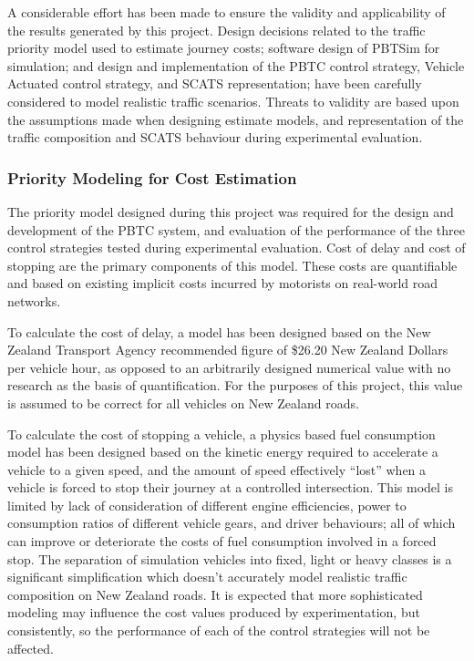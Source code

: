A considerable effort has been made to ensure the validity and applicability of the results generated by this project. Design decisions related to the traffic priority model used to estimate journey costs; software design of PBTSim for simulation; and design and implementation of the PBTC control strategy, Vehicle Actuated control strategy, and SCATS representation; have been carefully considered to model realistic traffic scenarios. Threats to validity are based upon the assumptions made when designing estimate models, and representation of the traffic composition and SCATS behaviour during experimental evaluation.

\subsubsection{Priority Modeling for Cost Estimation}

The priority model designed during this project was required for the design and development of the PBTC system, and evaluation of the performance of the three control strategies tested during experimental evaluation. Cost of delay and cost of stopping are the primary components of this model. These costs are quantifiable and based on existing implicit costs incurred by motorists on real-world road networks. 

To calculate the cost of delay, a model has been designed based on the New Zealand Transport Agency recommended figure of \$26.20 New Zealand Dollars per vehicle hour, as opposed to an arbitrarily designed numerical value with no research as the basis of quantification. For the purposes of this project, this value is assumed to be correct for all vehicles on New Zealand roads. 

To calculate the cost of stopping a vehicle, a physics based fuel consumption model has been designed based on the kinetic energy required to accelerate a vehicle to a given speed, and the amount of speed effectively ``lost'' when a vehicle is forced to stop their journey at a controlled intersection. This model is limited by lack of consideration of different engine efficiencies, power to consumption ratios of different vehicle gears, and driver behaviours; all of which can improve or deteriorate the costs of fuel consumption involved in a forced stop. The separation of simulation vehicles into fixed, light or heavy classes is a significant simplification which doesn't accurately model realistic traffic composition on New Zealand roads. It is expected that more sophisticated modeling may influence the cost values produced by experimentation, but consistently, so the performance of each of the control strategies will not be affected.

